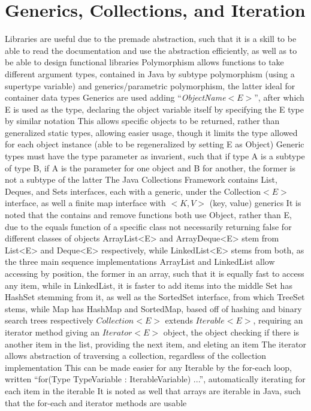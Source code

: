 \documentclass[11 pt, twoside]{article}
\newenvironment{outline*}
{
	\begin{outline}[enumerate]
	}
	{\end{outline}
}
\begin{document}
\section{Generics, Collections, and Iteration}
\begin{outline*}
\1 Libraries are useful due to the premade abstraction, such that it is a skill to be able to read the documentation and use the abstraction efficiently, as well as to be able to design functional libraries
\1 Polymorphism allows functions to take different argument types, contained in Java by subtype polymorphism (using a supertype variable) and generics/parametric polymorphism, the latter ideal for container data types
	\2 Generics are used adding ``\textit{ObjectName}$<E>$'', after which E is used as the type, declaring the object variable itself by specifying the E type by similar notation
		\3 This allows specific objects to be returned, rather than generalized static types, allowing easier usage, though it limits the type allowed for each object instance (able to be regeneralized by setting E as Object)
	\2 Generic types must have the type parameter as invarient, such that if type A is a subtype of type B, if A is the parameter for one object and B for another, the former is not a subtype of the latter
\1 The Java Collections Framework contains List, Deques, and Sets interfaces, each with a generic, under the Collection$<E>$ interface, as well a finite map interface with $<K, V>$ (key, value) generics
	\2 It is noted that the contains and remove functions both use Object, rather than E, due to the equals function of a specific class not necessarily returning false for different classes of objects
	\2 ArrayList<E> and ArrayDeque<E> stem from List<E> and Deque<E> respectively, while LinkedList<E> stems from both, as the three main sequence implementations
		\3 ArrayList and LinkedList allow accessing by position, the former in an array, such that it is equally fast to access any item, while in LinkedList, it is faster to add items into the middle
	\2 Set has HashSet stemming from it, as well as the SortedSet interface, from which TreeSet stems, while Map has HashMap and SortedMap, based off of hashing and binary search trees respectively
	\2 $Collection<E>$ extends $Iterable<E>$, requiring an iterator method giving an $Iterator<E>$ object, the object checking if there is another item in the list, providing the next item, and eleting an item
		\3 The iterator allows abstraction of traversing a collection, regardless of the collection implementation
		\3 This can be made easier for any Iterable by the for-each loop, written ``for(Type TypeVariable : IterableVariable) {...}'', automatically iterating for each item in the iterable
			\4 It is noted as well that arrays are iterable in Java, such that the for-each and iterator methods are usable
\end{outline*}
\end{document}
